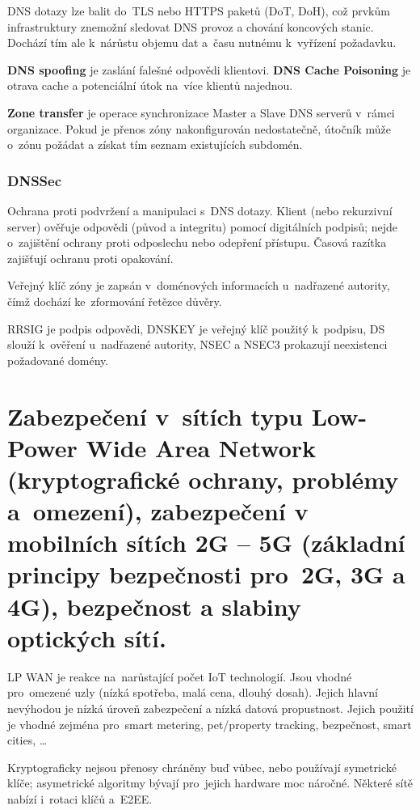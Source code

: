 DNS dotazy lze balit do~TLS nebo HTTPS paketů  (DoT, DoH), což prvkům infrastruktury znemožní sledovat DNS provoz a chování koncových stanic.
Dochází tím ale k~nárůstu objemu dat a~času nutnému k~vyřízení požadavku.

\textbf{DNS spoofing} je zaslání falešné odpovědi klientovi.
\textbf{DNS Cache Poisoning} je otrava cache a potenciální útok na~více klientů najednou.

\textbf{Zone transfer} je operace synchronizace Master a Slave DNS serverů v~rámci organizace.
Pokud je přenos zóny nakonfigurován nedostatečně, útočník může o~zónu požádat a získat tím seznam existujících subdomén.


\subsubsection{DNSSec}

Ochrana proti podvržení a manipulaci s~DNS dotazy.
Klient (nebo rekurzivní server) ověřuje odpovědi (původ a integritu) pomocí digitálních podpisů; nejde o~zajištění ochrany proti odposlechu nebo odepření přístupu.
Časová razítka zajišťují ochranu proti opakování.

Veřejný klíč zóny je zapsán v~doménových informacích u~nadřazené autority, čímž dochází ke~zformování řetězce důvěry.

RRSIG je podpis odpovědi, DNSKEY je veřejný klíč použitý k~podpisu, DS slouží k~ověření u~nadřazené autority, NSEC a NSEC3 prokazují neexistenci požadované domény.


\clearpage
\section{Zabezpečení v~sítích typu Low-Power Wide Area Network (kryptografické ochrany, problémy a~omezení), zabezpečení v mobilních sítích 2G -- 5G (základní principy bezpečnosti pro~2G, 3G a 4G), bezpečnost a slabiny optických sítí.}

LP WAN je reakce na~narůstající počet IoT technologií.
Jsou vhodné pro~omezené uzly (nízká spotřeba, malá cena, dlouhý dosah).
Jejich hlavní nevýhodou je nízká úroveň zabezpečení a nízká datová propustnost.
Jejich použití je vhodné zejména pro~smart metering, pet/property tracking, bezpečnost, smart cities, \dots

Kryptograficky nejsou přenosy chráněny buď vůbec, nebo používají symetrické klíče; asymetrické algoritmy bývají pro~jejich hardware moc náročné.
Některé sítě nabízí i~rotaci klíčů a~E2EE.



